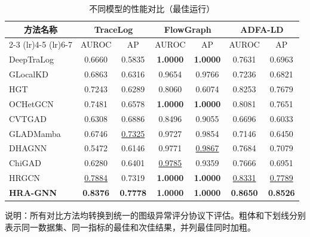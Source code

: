 \begin{table}[t]
\centering
\scriptsize
\renewcommand{\arraystretch}{0.92}
\setlength{\tabcolsep}{4pt}
\caption{不同模型的性能对比（最佳运行）}
\label{tab:final_auroc_ap_results_no_hdfs}
\begin{tabular}{lcccccc}
\toprule
\multicolumn{1}{c}{\multirow{2}{*}{方法名称}} & \multicolumn{2}{c}{TraceLog} & \multicolumn{2}{c}{FlowGraph} & \multicolumn{2}{c}{ADFA-LD} \\
\cmidrule(lr){2-3} \cmidrule(lr){4-5} \cmidrule(lr){6-7}
 & AUROC & AP & AUROC & AP & AUROC & AP \\
\midrule
DeepTraLog & 0.6660 & 0.5835 & \textbf{1.0000} & \textbf{1.0000} & 0.7631 & 0.6963 \\
\addlinespace
GLocalKD & 0.6863 & 0.6316 & 0.9654 & 0.9766 & 0.7236 & 0.6821 \\
\addlinespace
HGT & 0.7243 & 0.6289 & 0.8060 & 0.6074 & 0.8253 & 0.7679 \\
\addlinespace
OCHetGCN & 0.7481 & 0.6578 & \textbf{1.0000} & \textbf{1.0000} & 0.8081 & 0.7651 \\
\addlinespace
CVTGAD & 0.6308 & 0.6886 & 0.8496 & 0.9055 & 0.6696 & 0.6033 \\
\addlinespace
GLADMamba & 0.6746 & \underline{0.7325} & 0.9727 & 0.9854 & 0.7146 & 0.6450 \\
\addlinespace
DHAGNN & 0.5472 & 0.6146 & 0.9771 & \underline{0.9867} & 0.7684 & 0.7079 \\
\addlinespace
ChiGAD & 0.6280 & 0.6401 & \underline{0.9785} & 0.9359 & 0.7666 & 0.6951 \\
\addlinespace
HRGCN & \underline{0.7884} & 0.7319 & \textbf{1.0000} & \textbf{1.0000} & \underline{0.8331} & \underline{0.7789} \\
\addlinespace
\textbf{HRA-GNN} & \textbf{0.8376} & \textbf{0.7778} & \textbf{1.0000} & \textbf{1.0000} & \textbf{0.8650} & \textbf{0.8526} \\
\bottomrule
\end{tabular}%
\par\vspace{2pt}
\begin{minipage}{\textwidth}
\scriptsize
说明：所有对比方法均转换到统一的图级异常评分协议下评估。粗体和下划线分别表示同一数据集、同一指标的最佳和次佳结果，并列最佳同时加粗。
\end{minipage}
\end{table}
